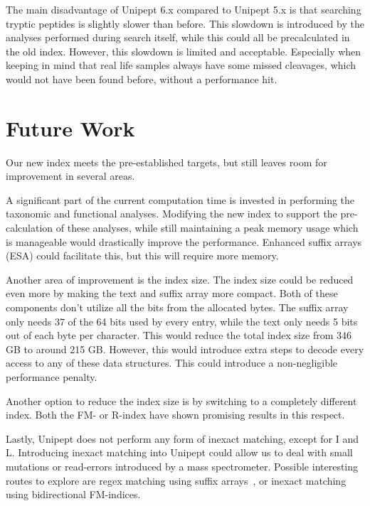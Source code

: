 \documentclass[11pt]{article}
\begin{document}
\begin{multicols}{2}
        The main disadvantage of Unipept 6.x compared to Unipept 5.x is that searching tryptic peptides is slightly slower than before.
        This slowdown is introduced by the analyses performed during search itself, while this could all be precalculated in the old index.
        However, this slowdown is limited and acceptable.
        Especially when keeping in mind that real life samples always have some missed cleavages, which would not have been found before, without a performance hit.

        \section{Future Work}
        Our new index meets the pre-established targets, but still leaves room for improvement in several areas.

        A significant part of the current computation time is invested in performing the taxonomic and functional analyses.
        Modifying the new index to support the pre-calculation of these analyses, while still maintaining a peak memory usage which is manageable would drastically improve the performance.
        Enhanced suffix arrays (ESA) could facilitate this, but this will require more memory.

        Another area of improvement is the index size.
        The index size could be reduced even more by making the text and suffix array more compact.
        Both of these components don't utilize all the bits from the allocated bytes.
        The suffix array only needs 37 of the 64 bits used by every entry, while the text only needs 5 bits out of each byte per character.
        This would reduce the total index size from 346 GB to around 215 GB\@.
        However, this would introduce extra steps to decode every access to any of these data structures.
        This could introduce a non-negligible performance penalty.

        Another option to reduce the index size is by switching to a completely different index.
        Both the FM- or R-index have shown promising results in this respect.

        Lastly, Unipept does not perform any form of inexact matching, except for I and L\@.
        Introducing inexact matching into Unipept could allow us to deal with small mutations or read-errors introduced by a mass spectrometer.
        Possible interesting routes to explore are regex matching using suffix arrays~\cite{regex_sa}, or inexact matching using bidirectional FM-indices.
        \printbibliography
    \end{multicols}
\end{document}
